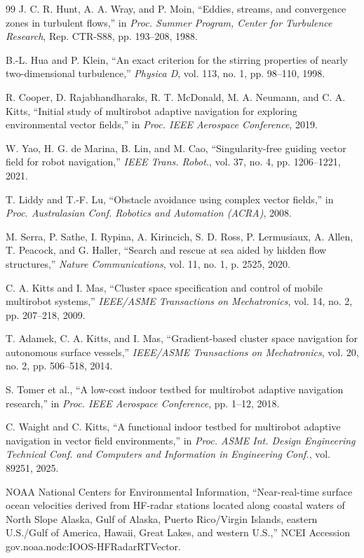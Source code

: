 \documentclass[lettersize,journal]{IEEEtran}
\begin{document}
\begin{thebibliography}{99}
 J. C. R. Hunt, A. A. Wray, and P. Moin, ``Eddies, streams, and
convergence zones in turbulent flows,'' in \textit{Proc. Summer Program,
Center for Turbulence Research}, Rep. CTR-S88, pp. 193--208, 1988.

 B.-L. Hua and P. Klein, ``An exact criterion for the stirring
properties of nearly two-dimensional turbulence,'' \textit{Physica D}, vol. 113,
no. 1, pp. 98--110, 1998.

 R. Cooper, D. Rajabhandharaks, R. T. McDonald, M. A. Neumann,
and C. A. Kitts, ``Initial study of multirobot adaptive
navigation for exploring environmental vector fields,'' in \textit{Proc.
IEEE Aerospace Conference}, 2019.

 W. Yao, H. G. de Marina, B. Lin, and M. Cao,
``Singularity-free guiding vector field for robot navigation,''
\textit{IEEE Trans. Robot.}, vol. 37, no. 4, pp. 1206--1221, 2021.

 T. Liddy and T.-F. Lu, ``Obstacle avoidance using complex
vector fields,'' in \textit{Proc. Australasian Conf. Robotics and
Automation (ACRA)}, 2008.

 M. Serra, P. Sathe, I. Rypina, A. Kirincich, S. D. Ross,
P. Lermusiaux, A. Allen, T. Peacock, and G. Haller, ``Search and rescue
at sea aided by hidden flow structures,'' \textit{Nature Communications},
vol. 11, no. 1, p. 2525, 2020.

 C. A. Kitts and I. Mas, ``Cluster space specification and control
of mobile multirobot systems,'' \textit{IEEE/ASME Transactions on Mechatronics},
vol. 14, no. 2, pp. 207--218, 2009.

 T. Adamek, C. A. Kitts, and I. Mas, ``Gradient-based cluster space
navigation for autonomous surface vessels,'' \textit{IEEE/ASME Transactions on
Mechatronics}, vol. 20, no. 2, pp. 506--518, 2014.

 S. Tomer et al., ``A low-cost indoor testbed for multirobot
adaptive navigation research,'' in \textit{Proc. IEEE Aerospace Conference},
pp. 1--12, 2018.

 C. Waight and C. Kitts, ``A functional indoor testbed for
multirobot adaptive navigation in vector field environments,'' in
\textit{Proc. ASME Int. Design Engineering Technical Conf. and Computers
and Information in Engineering Conf.}, vol. 89251, 2025.

 NOAA National Centers for Environmental Information,
``Near-real-time surface ocean velocities derived from HF-radar stations
located along coastal waters of North Slope Alaska, Gulf of Alaska,
Puerto Rico/Virgin Islands, eastern U.S./Gulf of America, Hawaii, Great
Lakes, and western U.S.,'' NCEI Accession
gov.noaa.nodc:IOOS-HFRadarRTVector.

\end{thebibliography}
\end{document}
